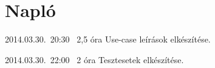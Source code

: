 %
\section{Napló}

\begin{naplo}

\bejegyzes
{2014.03.30.~20:30~} %
{2,5 óra} %
{\vadam} %
{Use-case leírások elkészítése.} %


\bejegyzes
{2014.03.30.~22:00~}
{2 óra}
{\vantal}
{Tesztesetek elkészítése.}


\end{naplo}

